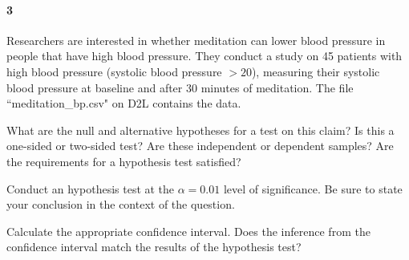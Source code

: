 \documentclass{article}
\begin{document}
\begin{flushleft}
\begin{enumalpha}
\end{enumalpha}

\newpage
\paragraph{3} Researchers are interested in whether meditation can lower blood pressure in people that have high blood pressure. They conduct a study on 45 patients with high blood pressure (systolic blood pressure $> 20$), measuring their systolic blood pressure at baseline and after 30 minutes of meditation. The file ``meditation\_bp.csv" on D2L contains the data.
\begin{enumalpha}
\item What are the null and alternative hypotheses for a test on this claim? Is this a one-sided or two-sided test? Are these independent or dependent samples? Are the requirements for a hypothesis test satisfied?
\vspace{2in}
\item Conduct an hypothesis test at the $\alpha = 0.01$ level of significance. Be sure to state your conclusion in the context of the question.
\vspace{2in}
\item Calculate the appropriate confidence interval. Does the inference from the confidence interval match the results of the hypothesis test?

\vspace{2.25in}
\end{enumalpha}



\end{flushleft}
\end{document}
